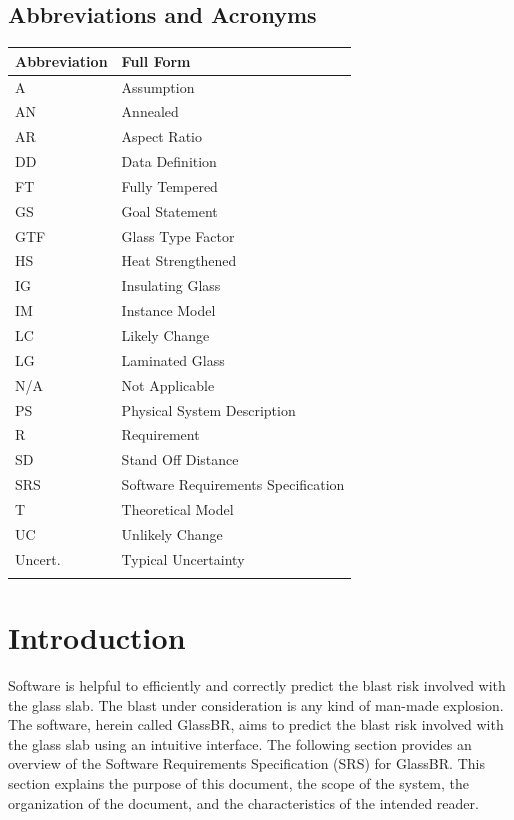 \documentclass[12pt]{article}
\begin{document}
\subsection{Abbreviations and Acronyms}
\label{Sec:TAbbAcc}
\begin{longtable*}{l l}
\toprule
Abbreviation & Full Form
\\
\midrule
A & Assumption
\\
AN & Annealed
\\
AR & Aspect Ratio
\\
DD & Data Definition
\\
FT & Fully Tempered
\\
GS & Goal Statement
\\
GTF & Glass Type Factor
\\
HS & Heat Strengthened
\\
IG & Insulating Glass
\\
IM & Instance Model
\\
LC & Likely Change
\\
LG & Laminated Glass
\\
N/A & Not Applicable
\\
PS & Physical System Description
\\
R & Requirement
\\
SD & Stand Off Distance
\\
SRS & Software Requirements Specification
\\
T & Theoretical Model
\\
UC & Unlikely Change
\\
Uncert. & Typical Uncertainty
\\
\bottomrule
\label{Table:TAbbAcc}
\end{longtable*}
\section{Introduction}
\label{Sec:Intro}
Software is helpful to efficiently and correctly predict the blast risk involved with the glass slab. The blast under consideration is any kind of man-made explosion. The software, herein called GlassBR, aims to predict the blast risk involved with the glass slab using an intuitive interface.
The following section provides an overview of the Software Requirements Specification (SRS) for GlassBR. This section explains the purpose of this document, the scope of the system, the organization of the document, and the characteristics of the intended reader.
\end{document}
